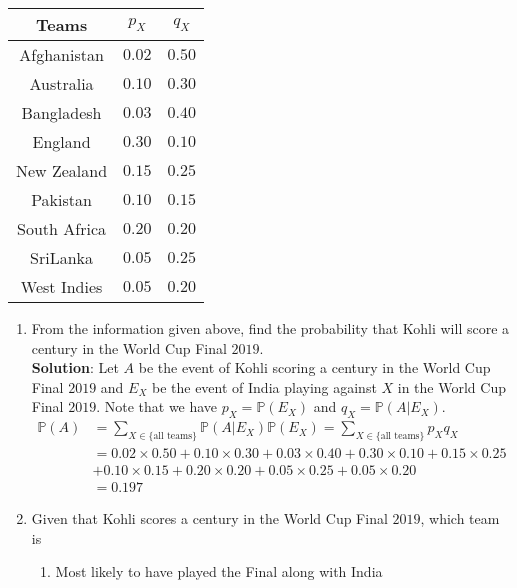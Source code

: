 \documentclass{article}
\newcommand{\dsum}{\displaystyle\sum}
\newcommand{\Pb}{\mathbb{P}}
\newcommand{\bkt}[1]{\left(#1\right)}
\newcommand{\soln}[1]{\textbf{Solution}: #1}
\begin{document}
\begin{enumerate}
		\begin{table}[!htbp]
			\begin{center}
			\begin{tabular}{|c|c|c|}
				\hline
				Teams & $p_X$ & $q_X$\\
				\hline
				\hline
				Afghanistan & $0.02$ & $0.50$\\
				\hline
				Australia & $0.10$ & $0.30$ \\
				\hline
				Bangladesh & $0.03$ & $0.40$\\
				\hline
				England & $0.30$ & $0.10$\\
				\hline
				New Zealand & $0.15$ & $0.25$\\
				\hline
				Pakistan & $0.10$ & $0.15$\\
				\hline
				South Africa & $0.20$ & $0.20$\\
				\hline
				SriLanka & $0.05$ & $0.25$\\
				\hline
				West Indies & $0.05$ & $0.20$\\
				\hline
			\end{tabular}
			\end{center}
		\end{table}
		\begin{enumerate}
			\item
			From the information given above, find the probability that Kohli will score a century in the World Cup Final $2019$.\\
			\soln{
			Let $A$ be the event of Kohli scoring a century in the World Cup Final $2019$ and $E_X$ be the event of India playing against $X$ in the World Cup Final $2019$. Note that we have $p_X = \Pb \bkt{E_X}$ and $q_X = \Pb\bkt{A \vert E_X}$.
			\begin{align*}
				\Pb\bkt{A} & = \dsum_{X \in \{\text{all teams}\}}\Pb\bkt{A \vert E_X} \Pb \bkt{E_X} = \dsum_{X \in \{\text{all teams}\}}p_X q_X\\
				& = 0.02 \times 0.50 + 0.10 \times 0.30 + 0.03 \times 0.40 + 0.30 \times 0.10 + 0.15 \times 0.25\\
				& + 0.10 \times 0.15 + 0.20 \times 0.20 + 0.05 \times 0.25 + 0.05 \times 0.20\\
				& = 0.197
			\end{align*}
			}
			\item
			Given that Kohli scores a century in the World Cup Final $2019$, which team is
			\begin{enumerate} 
				\item Most likely to have played the Final along with India

\end{enumerate}
\end{enumerate}
\end{enumerate}
\end{document}
